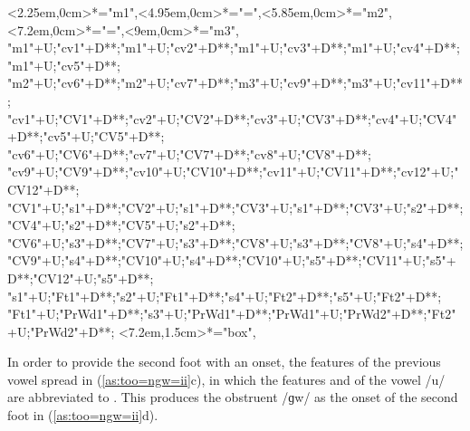 \begin{multicols}{2}
\begin{exe}
{\begin{xlist}
{		<2.25em,0cm>*="m1",<4.95em,0cm>*\as{=}="=",<5.85em,0cm>*="m2",
		<7.2em,0cm>*\as{=}="=",<9em,0cm>*="m3",
		"m1"+U;"cv1"+D**\dir{-};"m1"+U;"cv2"+D**\dir{-};"m1"+U;"cv3"+D**\dir{};"m1"+U;"cv4"+D**\dir{-};"m1"+U;"cv5"+D**\dir{};
		"m2"+U;"cv6"+D**\dir{-};"m2"+U;"cv7"+D**\dir{-};"m3"+U;"cv9"+D**\dir{-};"m3"+U;"cv11"+D**\dir{-};
		"cv1"+U;"CV1"+D**\dir{-};"cv2"+U;"CV2"+D**\dir{-};"cv3"+U;"CV3"+D**\dir{};"cv4"+U;"CV4"+D**\dir{-};"cv5"+U;"CV5"+D**\dir{};
		"cv6"+U;"CV6"+D**\dir{-};"cv7"+U;"CV7"+D**\dir{-};"cv8"+U;"CV8"+D**\dir{};
		"cv9"+U;"CV9"+D**\dir{-};"cv10"+U;"CV10"+D**\dir{};"cv11"+U;"CV11"+D**\dir{-};"cv12"+U;"CV12"+D**\dir{};
		"CV1"+U;"s1"+D**\dir{-};"CV2"+U;"s1"+D**\dir{-};"CV3"+U;"s1"+D**\dir{-};"CV3"+U;"s2"+D**\dir{-};"CV4"+U;"s2"+D**\dir{-};"CV5"+U;"s2"+D**\dir{-};
		"CV6"+U;"s3"+D**\dir{-};"CV7"+U;"s3"+D**\dir{-};"CV8"+U;"s3"+D**\dir{-};"CV8"+U;"s4"+D**\dir{-};
		"CV9"+U;"s4"+D**\dir{-};"CV10"+U;"s4"+D**\dir{-};"CV10"+U;"s5"+D**\dir{-};"CV11"+U;"s5"+D**\dir{-};"CV12"+U;"s5"+D**\dir{-};
		"s1"+U;"Ft1"+D**\dir{-};"s2"+U;"Ft1"+D**\dir{-};"s4"+U;"Ft2"+D**\dir{-};"s5"+U;"Ft2"+D**\dir{-};
		"Ft1"+U;"PrWd1"+D**\dir{-};"s3"+U;"PrWd1"+D**\dir{-};"PrWd1"+U;"PrWd2"+D**\dir{-};"Ft2"+U;"PrWd2"+D**\dir{-};
		<7.2em,1.5cm>*="box",
	\endxy}\label{as:too=ngw=ii2}
	\end{xlist}}
\end{exe}
\end{multicols}

In order to provide the second foot with an onset,
the features of the previous vowel spread in (\ref{as:too=ngw=ii}c),
in which the features \tsc{[+back]} and \tsc{[+round]} of the vowel /u/
are abbreviated to \tsc{[+v.]}.
This produces the obstruent /ɡw/
as the onset of the second foot in (\ref{as:too=ngw=ii}d).

